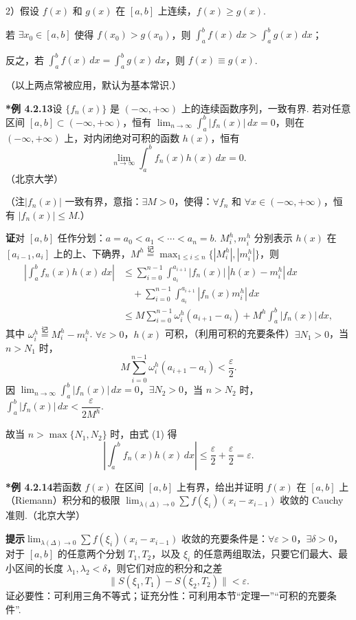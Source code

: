 \documentclass[UTF8,12pt,a4paper,fontset=fandol]{ctexart}
\begin{document}
2）假设 $f(x)$ 和 $g(x)$ 在 $[a,b]$ 上连续，$f(x)\ge g(x)$.

若 $\exists x_0\in[a,b]$ 使得 $f(x_0)>g(x_0)$，则 $\int_a^b f(x)\,dx>\int_a^b g(x)\,dx$；

反之，若 $\int_a^b f(x)\,dx=\int_a^b g(x)\,dx$，则 $f(x)\equiv g(x)$.

（以上两点常被应用，默认为基本常识.）

\noindent\textbf{*例 4.2.13}\quad 设 $\{f_n(x)\}$ 是 $(-\infty,+\infty)$ 上的连续函数序列，一致有界. 若对任意区间 $[a,b]\subset(-\infty,+\infty)$，恒有 $\lim_{n\to\infty}\int_a^b|f_n(x)|\,dx=0$，则在 $(-\infty,+\infty)$ 上，对内闭绝对可积的函数 $h(x)$，恒有
\[
\lim_{n\to\infty}\int_a^b f_n(x)h(x)\,dx=0.
\]
（北京大学）

（注\quad $|f_n(x)|$ 一致有界，意指：$\exists M>0$，使得：$\forall f_n$ 和 $\forall x\in(-\infty,+\infty)$，恒有 $|f_n(x)|\le M$.）

\noindent\textbf{证}\quad 对 $[a,b]$ 任作分划：$a=a_0<a_1<\cdots<a_n=b$. $M_i^h,m_i^h$ 分别表示 $h(x)$ 在 $[a_{i-1},a_i]$ 上的上、下确界，$M^h\stackrel{\text{记}}{=}\max_{1\le i\le n}\{|M_i^h|,|m_i^h|\}$，则
\[
\begin{aligned}
\left|\int_a^b f_n(x)h(x)\,dx\right|
&\le \sum_{i=0}^{n-1}\int_{a_i}^{a_{i+1}}|f_n(x)|\,|h(x)-m_i^h|\,dx\\
&\quad+\sum_{i=0}^{n-1}\int_{a_i}^{a_{i+1}}|f_n(x)m_i^h|\,dx\\
&\le M\sum_{i=0}^{n-1}\omega_i^h(a_{i+1}-a_i)
+M^h\int_a^b|f_n(x)|\,dx,
\end{aligned}
\tag{1}
\]
其中 $\omega_i^h\stackrel{\text{记}}{=}M_i^h-m_i^h$. $\forall\varepsilon>0$，$h(x)$ 可积，（利用可积的充要条件）$\exists N_1>0$，当 $n>N_1$ 时，
\[
M\sum_{i=0}^{n-1}\omega_i^h(a_{i+1}-a_i)<\frac{\varepsilon}{2}.
\]
因 $\lim_{n\to\infty}\int_a^b|f_n(x)|\,dx=0$，$\exists N_2>0$，当 $n>N_2$ 时，$\int_a^b|f_n(x)|\,dx<\dfrac{\varepsilon}{2M^h}$.

故当 $n>\max\{N_1,N_2\}$ 时，由式 (1) 得
\[
\left|\int_a^b f_n(x)h(x)\,dx\right|\le\frac{\varepsilon}{2}+\frac{\varepsilon}{2}=\varepsilon.
\]

\noindent\textbf{*例 4.2.14}\quad 若函数 $f(x)$ 在区间 $[a,b]$ 上有界，给出并证明 $f(x)$ 在 $[a,b]$ 上（Riemann）积分和的极限 $\lim_{\lambda(\Delta)\to0}\sum f(\xi_i)(x_i-x_{i-1})$ 收敛的 Cauchy 准则.（北京大学）

\noindent\textbf{提示}\quad $\lim_{\lambda(\Delta)\to0}\sum f(\xi_i)(x_i-x_{i-1})$ 收敛的充要条件是：$\forall\varepsilon>0$，$\exists\delta>0$，对于 $[a,b]$ 的任意两个分划 $T_1,T_2$，以及 $\xi_i$ 的任意两组取法，只要它们最大、最小区间的长度 $\lambda_1,\lambda_2<\delta$，则它们对应的积分和之差
\[
\|S(\xi_1,T_1)-S(\xi_2,T_2)\|<\varepsilon.
\tag{1}
\]
证必要性：可利用三角不等式；证充分性：可利用本节“定理一”“可积的充要条件”.
\end{document}
